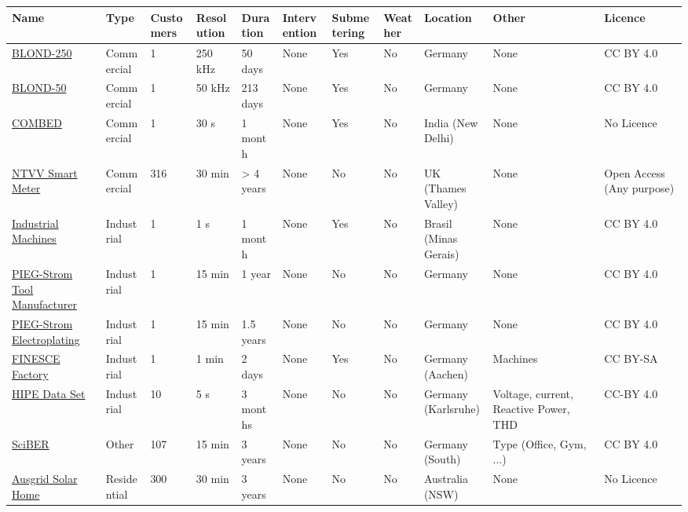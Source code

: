 \begin{tabular}{lllllllllll}
\toprule
Name &Type & Customers &   Resolution & Duration &  Intervention & Submetering & Weather &   Location &  Other & Licence \\
\midrule
\href{\url{https://mediatum.ub.tum.de/1375836}}{BLOND-250} &  Commercial & 1 &  250 kHz &  50 days &  None & Yes &  No &Germany &   None &   CC BY 4.0 \\
\href{\url{https://mediatum.ub.tum.de/1375836}}{BLOND-50} &  Commercial & 1 &   50 kHz & 213 days &  None & Yes &  No &Germany &   None &   CC BY 4.0 \\
\href{\url{https://combed.github.io/}}{COMBED} &  Commercial & 1 & 30 s &  1 month &  None & Yes &  No &  India (New Delhi) &   None &  No Licence \\
\href{\url{https://ukerc.rl.ac.uk/DC/cgi-bin/edc_search.pl?WantComp=147}}{NTVV Smart Meter} &  Commercial &   316 &   30 min &> 4 years &  None &  No &  No & UK (Thames Valley) &   None &   Open Access (Any purpose) \\
\href{\url{https://ieee-dataport.org/open-access/industrial-machines-dataset-electrical-load-disaggregation}}{Industrial Machines} &  Industrial & 1 &  1 s &  1 month &  None & Yes &  No &  Brasil (Minas Gerais) &   None &   CC BY 4.0 \\
\href{\url{https://www.zenodo.org/record/4683455#.Yg1RSu7MKYA}}{PIEG-Strom Tool Manufacturer} &  Industrial & 1 &   15 min &   1 year &  None &  No &  No &Germany &   None &   CC BY 4.0 \\
\href{\url{https://www.zenodo.org/record/4683479#.Yg1RSu7MKYA}}{PIEG-Strom Electroplating} &  Industrial & 1 &   15 min &1.5 years &  None &  No &  No &Germany &   None &   CC BY 4.0 \\
\href{\url{https://data.lab.fiware.org/organization/9569f9bd-42bd-414f-b8d9-112553ea9dfb?tags=FINESCE}}{FINESCE Factory} &  Industrial & 1 &1 min &   2 days &  None & Yes &  No &   Germany (Aachen) &   Machines &CC BY-SA \\
\href{\url{https://www.energystatusdata.kit.edu/hipe.php}}{HIPE Data Set} &  Industrial &10 &  5 s & 3 months &  None &  No &  No &Germany (Karlsruhe) &  Voltage, current, Reactive Power, THD &   CC-BY 4.0 \\
\href{\url{https://im.iism.kit.edu/sciber.php}}{SciBER} &   Other &   107 &   15 min &  3 years &  None &  No &  No &Germany (South) &Type (Office, Gym, ...) &   CC BY 4.0 \\
\href{\url{https://www.ausgrid.com.au/Industry/Our-Research/Data-to-share/Solar-home-electricity-data}}{Ausgrid Solar Home} & Residential &   300 &   30 min &  3 years &  None &  No &  No &Australia (NSW) &   None &  No Licence \\

\end{tabular}
